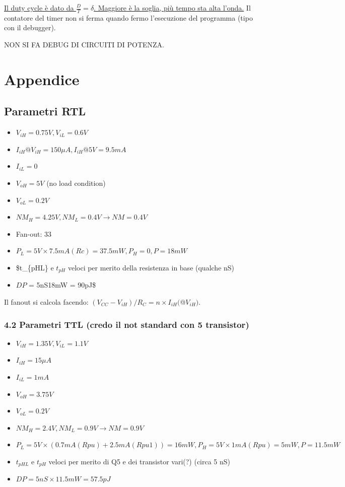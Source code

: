 \documentclass[
]{book}
\providecommand{\tightlist}{%
  \setlength{\itemsep}{0pt}\setlength{\parskip}{0pt}}
\begin{document}
\href{immagini/51.png}{Il duty cycle è dato da \(\frac{D}{T}=\delta\).
Maggiore è la soglia, più tempo sta alta l'onda.} Il contatore del timer
non si ferma quando fermo l'esecuzione del programma (tipo con il
debugger).

NON SI FA DEBUG DI CIRCUITI DI POTENZA.

\chapter{Appendice}\label{appendice}

\section{Parametri RTL}\label{parametri-rtl}

\begin{itemize}
\tightlist
\item
  \(V_{iH} = 0.75V, V_{iL} = 0.6V\)
\item
  \(I_{iH} @ V_{iH} = 150 \mu A, I_{iH} @ 5V = 9.5mA\)
\item
  \(I_{iL} = 0\)
\item
  \(V_{oH} = 5V\) (no load condition)
\item
  \(V_{oL} = 0.2V\)
\item
  \(NM_{H} = 4.25V, NM_{L} = 0.4V \to NM = 0.4V\)
\item
  Fan-out: 33
\item
  \(P_{L} = 5V\times 7.5mA (Rc) = 37.5mW, P_{H} = 0, P =18mW\)
\item
  \$t\_\{pHL\} e \(t_{pH}\) veloci per merito della resistenza in base
  (qualche nS)
\item
  \(DP\) = 5nS\times 18mW = 90pJ\$
\end{itemize}

Il fanout si calcola facendo:
\((V_{CC}-V_{iH})/R_{C}=n\times I_{iH}(\)@\(V_{iH})\).

\subsection{4.2 Parametri TTL (credo il not standard con 5
transistor)}\label{parametri-ttl-credo-il-not-standard-con-5-transistor}

\begin{itemize}
\tightlist
\item
  \(V_{iH} = 1.35V, V_{iL} = 1.1V\)
\item
  \(I_{iH} = 15\mu A\)
\item
  \(I_{iL} = 1mA\)
\item
  \(V_{oH} = 3.75V\)
\item
  \(V_{oL} = 0.2V\)
\item
  \(NM_{H} = 2.4V, NM_{L} = 0.9V \to NM = 0.9V\)
\item
  \(P_{L} = 5V\times(0.7mA (Rpu)+2.5mA (Rpu1)) = 16mW, P_{H} = 5V\times 1mA (Rpu) = 5mW, P=11.5mW\)
\item
  \(t_{pHL}\) e \(t_{pH}\) veloci per merito di Q5 e dei transistor
  vari(?) (circa 5 nS)
\item
  \(DP = 5nS\times 11.5mW = 57.5pJ\)
\end{itemize}

\backmatter
\end{document}
